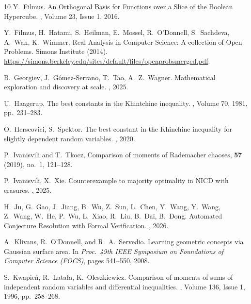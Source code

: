 \documentclass[11pt]{article}
\begin{document}
\begin{thebibliography}{10}
Y.~Filmus.
\newblock An Orthogonal Basis for Functions over a Slice of the Boolean Hypercube.
, Volume 23, Issue 1, 2016.

Y.~Filmus, H.~Hatami, S.~Heilman, E.~Mossel, R.~O'Donnell, S.~Sachdeva, A.~Wan, K.~Wimmer.
\newblock Real Analysis in Computer Science: A collection of Open Problems.
\newblock Simons Institute (2014). \url{https://simons.berkeley.edu/sites/default/files/openprobsmerged.pdf}.

B.~Georgiev, J.~G\'omez-Serrano, T.~Tao, A.~Z.~Wagner.
\newblock Mathematical exploration and discovery at scale.
,
2025.

U.~Haagerup.
\newblock The best constants in the Khintchine inequality.
, Volume 70,
1981, pp.~231--283.

O.~Herscovici, S.~Spektor.
\newblock The best constant in the Khinchine inequality for slightly dependent random variables.
,
2020.

P.~Ivanisvili and T.~Tkocz,
\newblock Comparison of moments of Rademacher chaoses,
 \textbf{57} (2019), no.~1, 121--128.

P.~Ivanisvili, X.~Xie.
\newblock Counterexample to majority optimality in NICD with erasures.
,
2025.

H.~Ju, G.~Gao, J.~Jiang, B.~Wu, Z.~Sun, L.~Chen, Y.~Wang, Y.~Wang,
Z.~Wang, W.~He, P.~Wu, L.~Xiao, R.~Liu, B.~Dai, B.~Dong.
\newblock Automated Conjecture Resolution with Formal Verification.
,
2026.

A.~Klivans, R.~O'Donnell, and R.~A.~Servedio.
\newblock Learning geometric concepts via Gaussian surface area.
\newblock In \emph{Proc.\ 49th IEEE Symposium on Foundations of Computer Science (FOCS)}, pages 541--550, 2008.

S.~Kwapie\'n, R.~Lata{\l}a, K.~Oleszkiewicz.
\newblock Comparison of moments of sums of independent random variables and differential inequalities.
, Volume 136, Issue 1,
1996, pp.~258--268.


\end{thebibliography}
\end{document}
